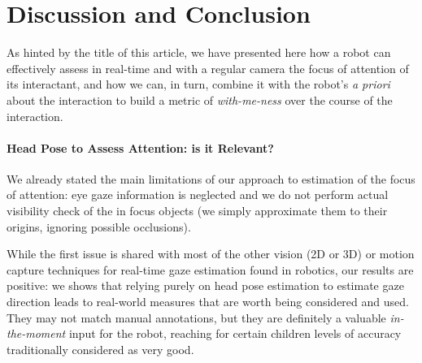 \documentclass{sig-alternate}
\begin{document}



\section{Discussion and Conclusion}

As hinted by the title of this article, we have presented here how a robot can
effectively assess in real-time and with a regular camera the focus of attention
of its interactant, and how we can, in turn, combine it with the robot's {\it a priori}
about the interaction to build a metric of
\emph{with-me-ness} over the course of the interaction.

\paragraph{Head Pose to Assess Attention: is it Relevant?}

%

We already stated the main limitations of our approach to estimation of the
focus of attention: eye gaze information is neglected and we do not perform
actual visibility check of the in focus objects (we simply approximate them to
their origins, ignoring possible occlusions).

While the first issue is shared with most of the other vision (2D or 3D) or motion
capture techniques for real-time gaze estimation found in robotics,
our results are positive: we shows that relying
purely on head pose estimation to estimate gaze direction leads to real-world
measures that are worth being considered and used. They may not match manual
annotations, but they are definitely a valuable \emph{in-the-moment} input for
the robot, reaching for certain children levels of accuracy traditionally
considered as very good.
\end{document}
